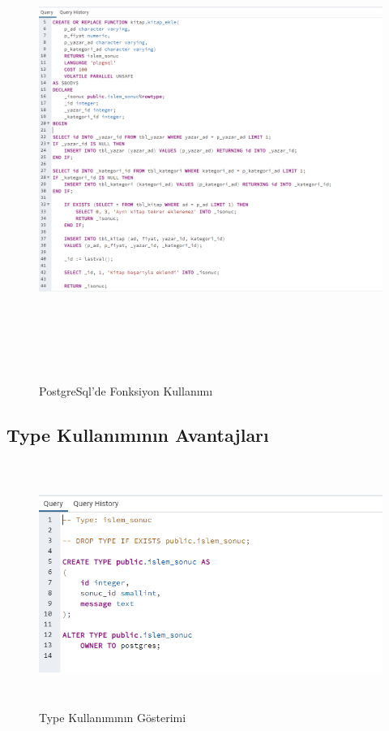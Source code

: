 \documentclass[12pt, a4paper]{article}
\begin{document}
	 \begin{figure}[htbp]
	\centering
	\includegraphics[width=15cm, height=15cm]{ekleFonksiyon.png}
	\caption{PostgreSql'de Fonksiyon Kullanımı}
	\label{fig:fonksiyon}
\end{figure}

\subsection{Type Kullanımının Avantajları}

\begin{figure}[htbp]
	\centering
	\includegraphics[width=\textwidth, height=8cm]{type.png}
	\caption{Type Kullanımının Gösterimi}
	\label{fig:type}
\end{figure}
\end{document}
